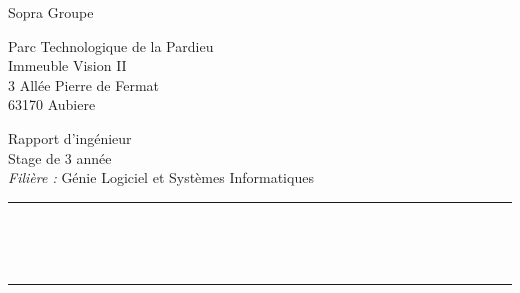 \begin{multicols}{2}
\begin{flushright}
		Sopra Groupe
		
		\vspace*{0.5cm}
		
		Parc Technologique de la Pardieu									\\
		Immeuble Vision II													\\
		3 Allée Pierre de Fermat											\\
		63170 Aubiere		
		
		
	\end{flushright}
\end{multicols}

\vspace*{\fill}

\begin{center}


	\Large
	Rapport d'ingénieur													\\
	Stage de 3 année											\\
	\textit{Filière :} Génie Logiciel et Systèmes Informatiques
	
	\rule{16cm}{2pt}													\\
	\vspace*{0.35cm}
	
	\huge
	\textbf{\@title}													\\

	\rule{16cm}{2pt}
	

\end{center}
	
\vspace*{\fill}

